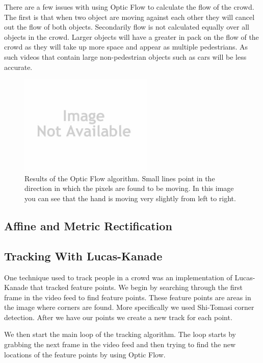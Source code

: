 \documentclass[conference]{IEEEtran}
\begin{document}
There are a few issues with using Optic Flow to calculate the flow of the crowd. The first is that when two object are moving against each other they will cancel out the flow of both objects. Secondarily flow is not calculated equally over all objects in the crowd. Larger objects will have a greater in pack on the flow of the crowd as they will take up more space and appear as multiple pedestrians. As such videos that contain large non-pedestrian objects such as cars will be less accurate.

\begin{figure}[!t]
\centering
\includegraphics[width=2.5in]{noImage.jpg}
\caption{Results of the Optic Flow algorithm. Small lines point in the direction in which the pixels are found to be moving. In this image you can see that the hand is moving very slightly from left to right.}
\label{Optic_Flow}
\end{figure}

\subsection{Affine and Metric Rectification}

\subsection{Tracking With Lucas-Kanade}

One technique used to track people in a crowd was an implementation of Lucas-Kanade that tracked feature points. We begin by searching through the first frame in the video feed to find feature points. These feature points are areas in the image where corners are found. More specifically we used Shi-Tomasi corner detection. After we have our points we create a new track for each point.

We then start the main loop of the tracking algorithm. The loop starts by grabbing the next frame in the video feed and then trying to find the new locations of the feature points by using Optic Flow.
\end{document}
